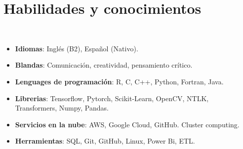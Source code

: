 \documentclass[a3paper]{adcv_color}
\begin{document}
\begin{minipage}{0.65\linewidth}
	\section{Habilidades y conocimientos}\\
	\begin{addmargin}[0.5em]{0.5em}
		\begin{itemize}[label={}]
			\setlength\itemsep{0em}
			\item \textbf{Idiomas}: Inglés (B2), Español (Nativo).
			\item \textbf{Blandas}:
				Comunicación, creatividad, pensamiento crítico.
			\item \textbf{Lenguages de programación}:
				R, C, C++, Python, Fortran, Java.
			\item \textbf{Librerias}:
				Tensorflow, Pytorch, Scikit-Learn, OpenCV, NTLK, Transformers, Numpy, Pandas.
			\item \textbf{Servicios en la nube}:
				AWS, Google Cloud, GitHub. Cluster computing.
			\item \textbf{Herramientas}:
				SQL, Git, GitHub, Linux, Power Bi, ETL.
		\end{itemize}
	\end{addmargin}
\end{minipage}
\end{document}
